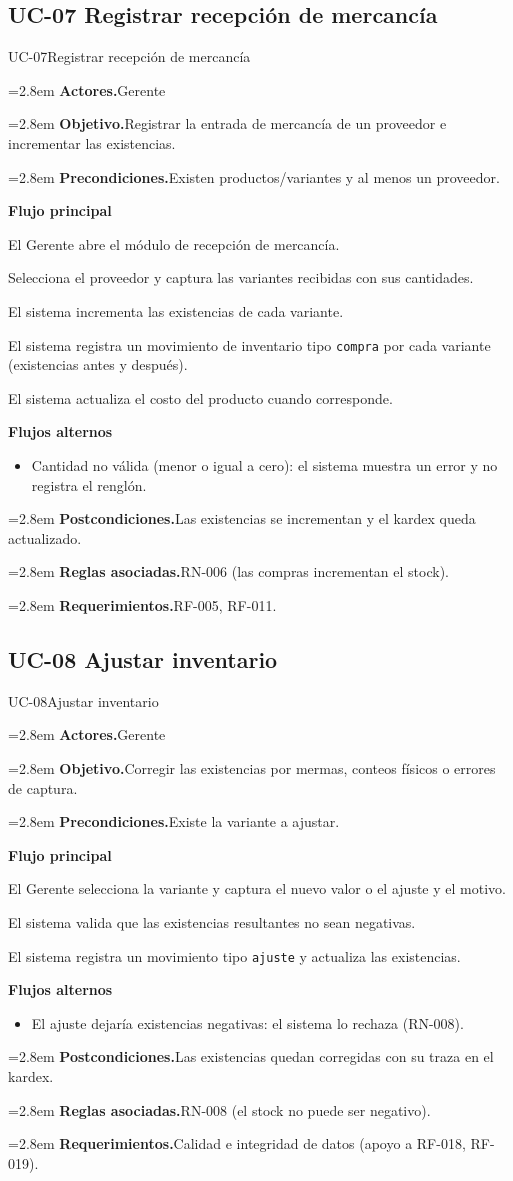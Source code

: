 \documentclass[11pt]{article}
\newcommand{\fila}[2]{\par\smallskip\noindent\hangindent=2.8em\hangafter=0
  \textbf{\sffamily\color{brand!80!black}#1.}\hspace{0.4em}#2\par}
\newcommand{\bloque}[1]{\par\smallskip\noindent\textbf{\sffamily\color{brand!80!black}#1}\par\nopagebreak}
\newenvironment{alternos}{\begin{itemize}[leftmargin=2.9em, itemsep=0.2ex, topsep=0.3ex]}{\end{itemize}}
\begin{document}
\subsection{UC-07 Registrar recepción de mercancía}
\begin{ficha}{UC-07}{Registrar recepción de mercancía}
\fila{Actores}{Gerente}
\fila{Objetivo}{Registrar la entrada de mercancía de un proveedor e incrementar las existencias.}
\fila{Precondiciones}{Existen productos/variantes y al menos un proveedor.}
\bloque{Flujo principal}
\begin{pasos}
  \item El Gerente abre el módulo de recepción de mercancía.
  \item Selecciona el proveedor y captura las variantes recibidas con sus cantidades.
  \item El sistema incrementa las existencias de cada variante.
  \item El sistema registra un movimiento de inventario tipo \texttt{compra} por cada variante (existencias antes y después).
  \item El sistema actualiza el costo del producto cuando corresponde.
\end{pasos}
\bloque{Flujos alternos}
\begin{alternos}
  \item[\textbf{2a.}] Cantidad no válida (menor o igual a cero): el sistema muestra un error y no registra el renglón.
\end{alternos}
\fila{Postcondiciones}{Las existencias se incrementan y el kardex queda actualizado.}
\fila{Reglas asociadas}{RN-006 (las compras incrementan el stock).}
\fila{Requerimientos}{RF-005, RF-011.}
\end{ficha}

\subsection{UC-08 Ajustar inventario}
\begin{ficha}{UC-08}{Ajustar inventario}
\fila{Actores}{Gerente}
\fila{Objetivo}{Corregir las existencias por mermas, conteos físicos o errores de captura.}
\fila{Precondiciones}{Existe la variante a ajustar.}
\bloque{Flujo principal}
\begin{pasos}
  \item El Gerente selecciona la variante y captura el nuevo valor o el ajuste y el motivo.
  \item El sistema valida que las existencias resultantes no sean negativas.
  \item El sistema registra un movimiento tipo \texttt{ajuste} y actualiza las existencias.
\end{pasos}
\bloque{Flujos alternos}
\begin{alternos}
  \item[\textbf{2a.}] El ajuste dejaría existencias negativas: el sistema lo rechaza (RN-008).
\end{alternos}
\fila{Postcondiciones}{Las existencias quedan corregidas con su traza en el kardex.}
\fila{Reglas asociadas}{RN-008 (el stock no puede ser negativo).}
\fila{Requerimientos}{Calidad e integridad de datos (apoyo a RF-018, RF-019).}
\end{ficha}
\end{document}
